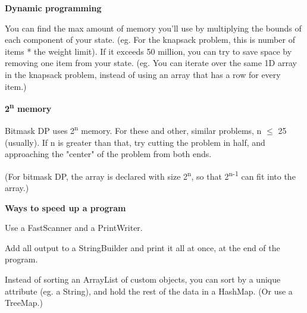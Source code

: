 \textbf{Dynamic programming}

You can find the max amount of memory you’ll use by multiplying the bounds of each component of your state. (eg. For the knapsack problem, this is number of items * the weight limit). If it exceeds 50 million, you can try to save space by removing one item from your state. (eg. You can iterate over the same 1D array in the knapsack problem, instead of using an array that has a row for every item.)

\textbf{2\textsuperscript{n} memory}

Bitmask DP uses 2\textsuperscript{n} memory. For these and other, similar problems, n $\leq$ 25 (usually). If n is greater than that, try cutting the problem in half, and approaching the "center" of the problem from both ends.

(For bitmask DP, the array is declared with size 2\textsuperscript{n}, so that 2\textsuperscript{n-1} can fit into the array.)

\textbf{Ways to speed up a program}

Use a FastScanner and a PrintWriter.

Add all output to a StringBuilder and print it all at once, at the end of the program.

Instead of sorting an ArrayList of custom objects, you can sort by a unique attribute (eg. a String), and hold the rest of the data in a HashMap. (Or use a TreeMap.)

\newpage